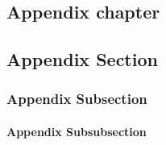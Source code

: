 \begin{appendices}
\clearpage
{}	

\chapter{Appendix chapter}
\lipsum

\section{Appendix Section}
\lipsum

\subsection{Appendix Subsection}
\lipsum

\subsubsection{Appendix Subsubsection}
\lipsum


\end{appendices}

